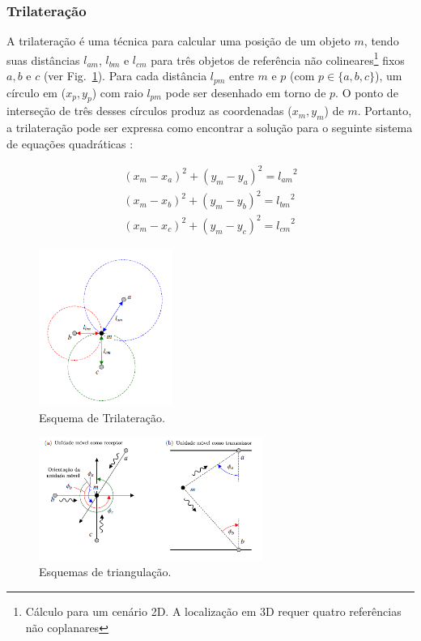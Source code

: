\subsubsection{Trilateração}\label{sec:trilat}
A trilateração é uma técnica para calcular uma posição de um objeto $m$, tendo suas distâncias $l_{am}$, $l_{bm}$ e $l_{cm}$ para três objetos de referência não colineares\footnote{ Cálculo para um cenário 2D. A localização em 3D requer quatro referências não coplanares} fixos $a, b$ e $c$ (ver Fig.~\ref{fig:trilateracao}). Para cada distância $l_{pm}$ entre $m$ e $p$ (com $p \in \{a, b, c\}$), um círculo em ($x_{p}, y_{p}$) com raio $l_{pm}$ pode ser desenhado em torno de $p$. O ponto de interseção de três desses círculos produz as coordenadas ($x_{m}, y_{m}$) de $m$. Portanto, a trilateração pode ser expressa como encontrar a solução para o seguinte sistema de equações quadráticas \cite{linde2006aspects}:

\begin{align*}
(x_{m}-x_{a})^{2} + (y_{m}-y_{a})^{2} = {l_{am}}^{2}\\
(x_{m}-x_{b})^{2} + (y_{m}-y_{b})^{2} = {l_{bm}}^{2}\\
(x_{m}-x_{c})^{2} + (y_{m}-y_{c})^{2} = {l_{cm}}^{2}
\end{align*}



 \begin{figure}[ht]
\centering
    \includegraphics[resolution=300,width=0.39\textwidth,natwidth=610,natheight=642]{images/trilateracao.png}
    \caption{Esquema de Trilateração.}
    \label{fig:trilateracao}
\end{figure}


\begin{figure}[ht]
\centering
\includegraphics[resolution=300,width=0.65\textwidth,natwidth=610,natheight=642]{images/triangulacao.png}
    \caption{Esquemas de triangulação.}
    \label{fig:triang}
\end{figure}

